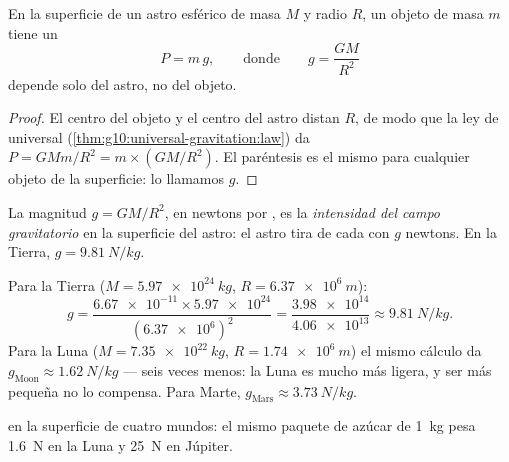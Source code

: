 \begin{proposition}\label{prop:g10:universal-gravitation:surfaceg}
En la superficie de un astro esférico de masa $M$ y radio $R$, un objeto
de masa $m$ tiene un 
\[
P = m\,g,
\qquad\text{donde}\qquad
g = \frac{G M}{R^2}
\]
depende solo del astro, no del objeto.
\end{proposition}

\begin{proof}
El centro del objeto y el centro del astro distan $R$, de modo que la
ley de  universal
(\cref{thm:g10:universal-gravitation:law}) da
$P = G M m / R^2 = m \times \left(G M / R^2\right)$. El paréntesis es el
mismo para cualquier objeto de la superficie: lo llamamos $g$.
\end{proof}

\begin{definition}\label{def:g10:universal-gravitation:fieldstrength}
La magnitud $g = G M / R^2$, en newtons por , es la
\emph{intensidad del campo gravitatorio} en la superficie del astro: el astro tira de cada
 con $g$ newtons. En la Tierra, $g = \qty{9.81}{N/kg}$.
\end{definition}

\begin{example}[Calcular $g$]\label{ex:g10:universal-gravitation:gvalues}
Para la Tierra ($M = \qty{5.97e24}{kg}$, $R = \qty{6.37e6}{m}$):
\[
g = \frac{\num{6.67e-11} \times \num{5.97e24}}{(\num{6.37e6})^2}
= \frac{\num{3.98e14}}{\num{4.06e13}}
\approx \qty{9.81}{N/kg}.
\]
Para la Luna ($M = \qty{7.35e22}{kg}$, $R = \qty{1.74e6}{m}$) el mismo
cálculo da $g_{\text{Moon}} \approx \qty{1.62}{N/kg}$ --- seis veces
menos: la Luna es mucho más ligera, y ser más pequeña no lo compensa.
Para Marte, $g_{\text{Mars}} \approx \qty{3.73}{N/kg}$.
\end{example}

\begin{omfigure}

{\small {} en la superficie de cuatro
mundos: el mismo paquete de azúcar de \qty{1}{kg} pesa \qty{1.6}{N} en
la Luna y \qty{25}{N} en Júpiter.}
\end{omfigure}

